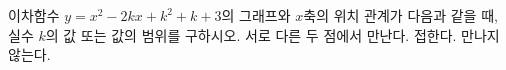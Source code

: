 이차함수 $y=x^2-2kx+k^2+k+3$의 그래프와 $x$축의 위치 관계가 다음과 같을 때, 실수 $k$의 값 또는 값의 범위를 구하시오.
 서로 다른 두 점에서 만난다.
 접한다.
 만나지 않는다.
